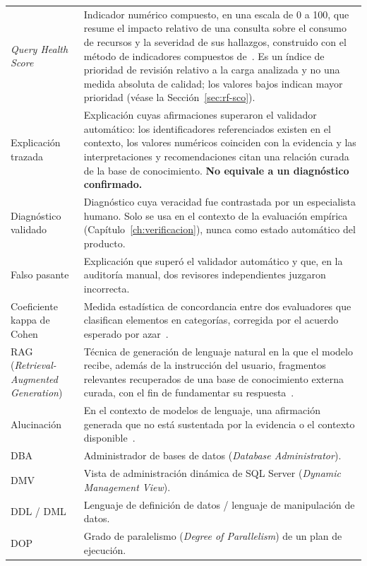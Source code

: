 \documentclass[11pt,a4paper]{report}
\begin{document}
\begin{xltabular}{\linewidth}{@{}lX@{}}
\textit{Query Health Score} & Indicador num\'erico compuesto, en una escala de 0 a 100, que resume el impacto relativo de una consulta sobre el consumo de recursos y la severidad de sus hallazgos, construido con el m\'etodo de indicadores compuestos de~\cite{R32}. Es un \'indice de prioridad de revisi\'on relativo a la carga analizada y no una medida absoluta de calidad; los valores bajos indican mayor prioridad (v\'ease la Secci\'on~\ref{sec:rf-sco}). \\
Explicaci\'on trazada & Explicaci\'on cuyas afirmaciones superaron el validador autom\'atico: los identificadores referenciados existen en el contexto, los valores num\'ericos coinciden con la evidencia y las interpretaciones y recomendaciones citan una relaci\'on curada de la base de conocimiento. \textbf{No equivale a un diagn\'ostico confirmado.} \\
Diagn\'ostico validado & Diagn\'ostico cuya veracidad fue contrastada por un especialista humano. Solo se usa en el contexto de la evaluaci\'on emp\'irica (Cap\'itulo~\ref{ch:verificacion}), nunca como estado autom\'atico del producto. \\
Falso pasante & Explicaci\'on que super\'o el validador autom\'atico y que, en la auditor\'ia manual, dos revisores independientes juzgaron incorrecta. \\
Coeficiente kappa de Cohen & Medida estad\'istica de concordancia entre dos evaluadores que clasifican elementos en categor\'ias, corregida por el acuerdo esperado por azar~\cite{R31}. \\
RAG (\textit{Retrieval-Augmented Generation}) & T\'ecnica de generaci\'on de lenguaje natural en la que el modelo recibe, adem\'as de la instrucci\'on del usuario, fragmentos relevantes recuperados de una base de conocimiento externa curada, con el fin de fundamentar su respuesta~\cite{R16}. \\
Alucinaci\'on & En el contexto de modelos de lenguaje, una afirmaci\'on generada que no est\'a sustentada por la evidencia o el contexto disponible~\cite{R18}. \\
DBA & Administrador de bases de datos (\textit{Database Administrator}). \\
DMV & Vista de administraci\'on din\'amica de SQL Server (\textit{Dynamic Management View}). \\
DDL / DML & Lenguaje de definici\'on de datos / lenguaje de manipulaci\'on de datos. \\
DOP & Grado de paralelismo (\textit{Degree of Parallelism}) de un plan de ejecuci\'on. \\

\end{xltabular}
\end{document}
